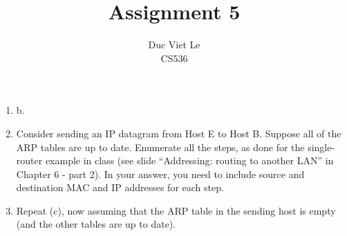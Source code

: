 \documentclass[11pt]{article}
\newenvironment{problem}[2][Problem]{\begin{trivlist}
\item[\hskip \labelsep {\bfseries #1}\hskip \labelsep {\bfseries #2.}]}{\end{trivlist}}
\begin{document}
\title{Assignment 5}
\author{Duc Viet Le\\ CS536}
\maketitle
\begin{problem}{1}
\end{problem}
\begin{enumerate}
	\item[a. ] b. 
	\pagebreak 
	\item[c. ]
	Consider sending an IP datagram from Host E to Host B. Suppose all of the ARP tables
	are up to date. Enumerate all the steps, as done for the single-router example in class
	(see slide “Addressing: routing to another LAN” in Chapter 6 - part 2). In your answer,
	you need to include source and destination MAC and IP addresses for each step.
	\item[d. ]
	Repeat (c), now assuming that the ARP table in the sending host is empty (and the
	other tables are up to date).
\end{enumerate}
\end{document}
